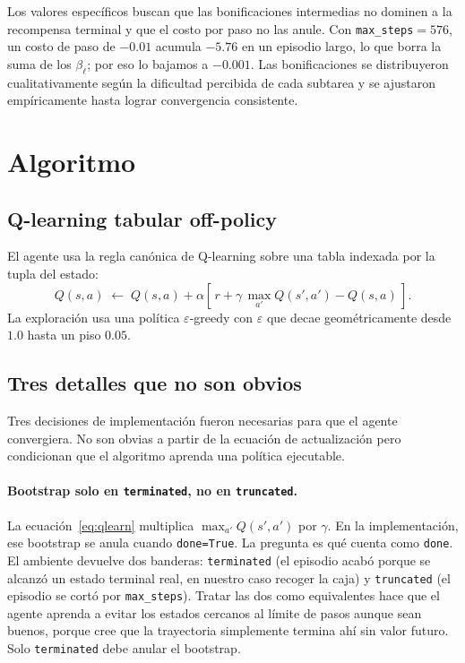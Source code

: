 \documentclass[11pt,a4paper]{article}
\begin{document}
Los valores específicos buscan que las bonificaciones intermedias no
dominen a la recompensa terminal y que el costo por paso no las anule.
Con \texttt{max\_steps}\(=576\), un costo de paso de \(-0.01\) acumula
\(-5.76\) en un episodio largo, lo que borra la suma de los
\(\beta_\ell\); por eso lo bajamos a \(-0.001\). Las bonificaciones se
distribuyeron cualitativamente según la dificultad percibida de cada
subtarea y se ajustaron empíricamente hasta lograr convergencia
consistente.

\section{Algoritmo}
\label{sec:algoritmo}

\subsection{Q-learning tabular off-policy}

El agente usa la regla canónica de Q-learning sobre una tabla indexada
por la tupla del estado:
\begin{equation}
  Q(s, a) \;\leftarrow\; Q(s, a) + \alpha \left[\, r + \gamma\,\max_{a'} Q(s', a') - Q(s, a) \,\right].
  \label{eq:qlearn}
\end{equation}
La exploración usa una política \(\varepsilon\)-greedy con
\(\varepsilon\) que decae geométricamente desde \(1.0\) hasta un piso
\(0.05\).

\subsection{Tres detalles que no son obvios}

Tres decisiones de implementación fueron necesarias para que el agente
convergiera. No son obvias a partir de la ecuación de actualización
pero condicionan que el algoritmo aprenda una política ejecutable.

\paragraph{Bootstrap solo en \texttt{terminated}, no en \texttt{truncated}.}
La ecuación~\ref{eq:qlearn} multiplica \(\max_{a'} Q(s', a')\) por
\(\gamma\). En la implementación, ese bootstrap se anula cuando
\texttt{done=True}. La pregunta es qué cuenta como \texttt{done}. El
ambiente devuelve dos banderas: \texttt{terminated} (el episodio acabó
porque se alcanzó un estado terminal real, en nuestro caso recoger la
caja) y \texttt{truncated} (el episodio se cortó por
\texttt{max\_steps}). Tratar las dos como equivalentes hace que el
agente aprenda a evitar los estados cercanos al límite de pasos aunque
sean buenos, porque cree que la trayectoria simplemente termina ahí sin
valor futuro. Solo \texttt{terminated} debe anular el bootstrap.
\end{document}
